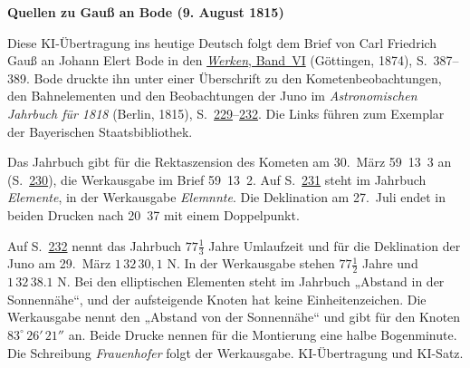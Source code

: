 \clearpage\thispagestyle{empty}
\begin{center}\textbf{Quellen zu Gauß an Bode (9. August 1815)}\end{center}
\noindent Diese KI-Übertragung ins heutige Deutsch folgt dem Brief von Carl Friedrich Gauß an Johann Elert Bode in den \href{https://gdz.sub.uni-goettingen.de/id/PPN236007467}{\textit{Werken}, Band~VI} (Göttingen, 1874), S.~387--389. Bode druckte ihn unter einer Überschrift zu den Kometenbeobachtungen, den Bahnelementen und den Beobachtungen der Juno im \textit{Astronomischen Jahrbuch für 1818} (Berlin, 1815), S.~\href{https://api.digitale-sammlungen.de/iiif/image/v2/bsb10538347_00237/full/1600,/0/default.jpg}{229}--\href{https://api.digitale-sammlungen.de/iiif/image/v2/bsb10538347_00240/full/1600,/0/default.jpg}{232}. Die Links führen zum Exemplar der Bayerischen Staatsbibliothek.
\par\smallskip\noindent Das Jahrbuch gibt für die Rektaszension des Kometen am 30.~März 59~13~3 an (S.~\href{https://api.digitale-sammlungen.de/iiif/image/v2/bsb10538347_00238/full/1600,/0/default.jpg}{230}), die Werkausgabe im Brief 59~13~2. Auf S.~\href{https://api.digitale-sammlungen.de/iiif/image/v2/bsb10538347_00239/full/1600,/0/default.jpg}{231} steht im Jahrbuch \textit{Elemente}, in der Werkausgabe \textit{Elemnnte}. Die Deklination am 27.~Juli endet in beiden Drucken nach 20~37 mit einem Doppelpunkt.
\par\smallskip\noindent Auf S.~\href{https://api.digitale-sammlungen.de/iiif/image/v2/bsb10538347_00240/full/1600,/0/default.jpg}{232} nennt das Jahrbuch $77\tfrac13$ Jahre Umlaufzeit und für die Deklination der Juno am 29.~März $1\,32\,30{,}1$ N. In der Werkausgabe stehen $77\tfrac12$ Jahre und $1\,32\,38.1$ N. Bei den elliptischen Elementen steht im Jahrbuch „Abstand in der Sonnennähe“, und der aufsteigende Knoten hat keine Einheitenzeichen. Die Werkausgabe nennt den „Abstand von der Sonnennähe“ und gibt für den Knoten $83^\circ\,26'\,21''$ an. Beide Drucke nennen für die Montierung eine halbe Bogenminute. Die Schreibung \textit{Frauenhofer} folgt der Werkausgabe. KI-Übertragung und KI-Satz.
\clearpage
